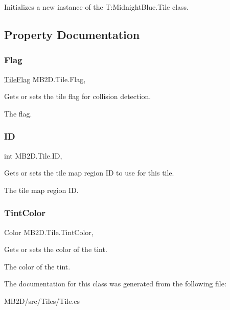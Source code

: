 Initializes a new instance of the T\+:\+Midnight\+Blue.\+Tile class. 



\subsection{Property Documentation}
\hypertarget{class_m_b2_d_1_1_tile_a46c14f1195c382dc033a26fa7ad407eb}{}\label{class_m_b2_d_1_1_tile_a46c14f1195c382dc033a26fa7ad407eb} 
\subsubsection{\texorpdfstring{Flag}{Flag}}
{\footnotesize\ttfamily \hyperlink{namespace_m_b2_d_a3ff821c2c17b424864d890d0b26536ea}{Tile\+Flag} M\+B2\+D.\+Tile.\+Flag\hspace{0.3cm}{\ttfamily [get]}, {\ttfamily [set]}}



Gets or sets the tile flag for collision detection. 

The flag.\hypertarget{class_m_b2_d_1_1_tile_a4b10263cc9eeca4a37043c6d99d81ace}{}\label{class_m_b2_d_1_1_tile_a4b10263cc9eeca4a37043c6d99d81ace} 
\subsubsection{\texorpdfstring{ID}{ID}}
{\footnotesize\ttfamily int M\+B2\+D.\+Tile.\+ID\hspace{0.3cm}{\ttfamily [get]}, {}}



Gets or sets the tile map region ID to use for this tile. 

The tile map region ID.\hypertarget{class_m_b2_d_1_1_tile_aec3aa2408ecc89cc40095f22b907eaa5}{}\label{class_m_b2_d_1_1_tile_aec3aa2408ecc89cc40095f22b907eaa5} 
\subsubsection{\texorpdfstring{Tint\+Color}{TintColor}}
{\footnotesize\ttfamily Color M\+B2\+D.\+Tile.\+Tint\+Color\hspace{0.3cm}{\ttfamily [get]}, {}}



Gets or sets the color of the tint. 

The color of the tint.

The documentation for this class was generated from the following file\+:\begin{DoxyCompactItemize}
\item 
M\+B2\+D/src/\+Tiles/Tile.\+cs\end{DoxyCompactItemize}
